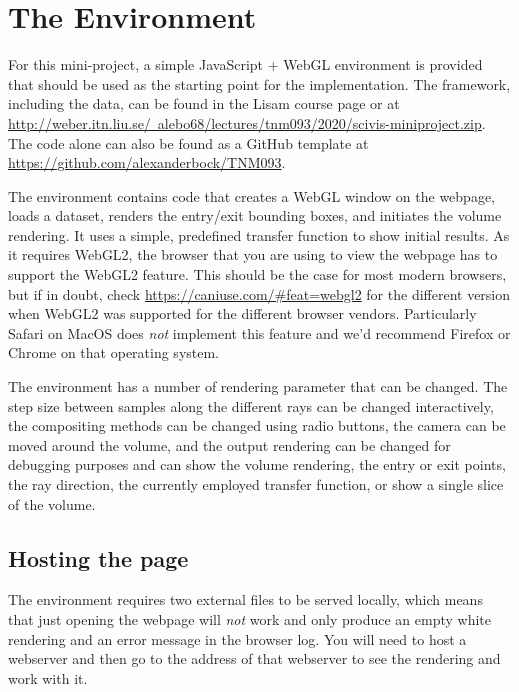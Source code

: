 \documentclass{labinstructions}
\begin{document}
\section{The Environment}
For this mini-project, a simple JavaScript + WebGL environment is provided that should be used as the starting point for the implementation.  The framework, including the data, can be found in the Lisam course page or at \href{http://www.itn.liu.se/~alebo68/lectures/tnm093/2020/scivis-miniproject.zip}{http://weber.itn.liu.se/~alebo68/lectures/tnm093/2020/scivis-miniproject.zip}.  The code alone can also be found as a GitHub template at \href{https://github.com/alexanderbock/TNM093}{https://github.com/alexanderbock/TNM093}.

The environment contains code that creates a WebGL window on the webpage, loads a dataset, renders the entry/exit bounding boxes, and initiates the volume rendering.  It uses a simple, predefined transfer function to show initial results.  As it requires WebGL2, the browser that you are using to view the webpage has to support the WebGL2 feature.  This should be the case for most modern browsers, but if in doubt, check \href{https://caniuse.com/\#feat=webgl2}{https://caniuse.com/\#feat=webgl2} for the different version when WebGL2 was supported for the different browser vendors.  Particularly Safari on MacOS does \emph{not} implement this feature and we'd recommend Firefox or Chrome on that operating system.

The environment has a number of rendering parameter that can be changed.  The step size between samples along the different rays can be changed interactively, the compositing methods can be changed using radio buttons, the camera can be moved around the volume, and the output rendering can be changed for debugging purposes and can show the volume rendering, the entry or exit points, the ray direction, the currently employed transfer function, or show a single slice of the volume.

\subsection{Hosting the page}
The environment requires two external files to be served locally, which means that just opening the webpage will \emph{not} work and only produce an empty white rendering and an error message in the browser log.  You will need to host a webserver and then go to the address of that webserver to see the rendering and work with it.  
\end{document}
